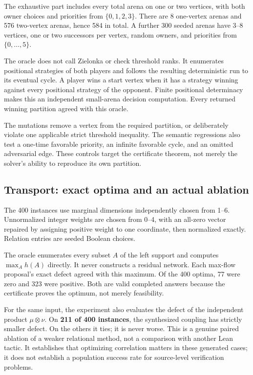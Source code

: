 The exhaustive part includes every total arena on one or two vertices, with
both owner choices and priorities from $\{0,1,2,3\}$. There are 8 one-vertex
arenas and 576 two-vertex arenas, hence 584 in total. A further 300 seeded
arenas have 3--8 vertices, one or two successors per vertex, random owners,
and priorities from $\{0,\ldots,5\}$.

The oracle does not call Zielonka or check threshold ranks. It enumerates
positional strategies of both players and follows the resulting deterministic
run to its eventual cycle. A player wins a start vertex when it has a strategy
winning against every positional strategy of the opponent. Finite positional
determinacy makes this an independent small-arena decision computation.
Every returned winning partition agreed with this oracle.

The mutations remove a vertex from the required partition, or deliberately
violate one applicable strict threshold inequality. The semantic regressions
also test a one-time favorable priority, an infinite favorable cycle, and
an omitted adversarial edge. These controls target the certificate theorem,
not merely the solver's ability to reproduce its own partition.

\subsection{Transport: exact optima and an actual ablation}

The 400 instances use marginal dimensions independently chosen from 1--6.
Unnormalized integer weights are chosen from 0--4, with an all-zero vector
repaired by assigning positive weight to one coordinate, then normalized
exactly. Relation entries are seeded Boolean choices.

The oracle enumerates every subset $A$ of the left support and computes
$\max_A h(A)$ directly. It never constructs a residual network. Each
max-flow proposal's exact defect agreed with this maximum.
Of the 400 optima, 77 were zero and 323 were positive. Both are valid completed
answers because the certificate proves the optimum, not merely feasibility.

For the same input, the experiment also evaluates the defect of the independent
product $\mu\otimes\nu$. On \textbf{211 of 400 instances}, the synthesized
coupling has strictly smaller defect. On the others it ties; it is never
worse. This is a genuine paired ablation of a weaker relational method, not a
comparison with another Lean tactic. It establishes that optimizing correlation
matters in these generated cases; it does not establish a population success
rate for source-level verification problems.


